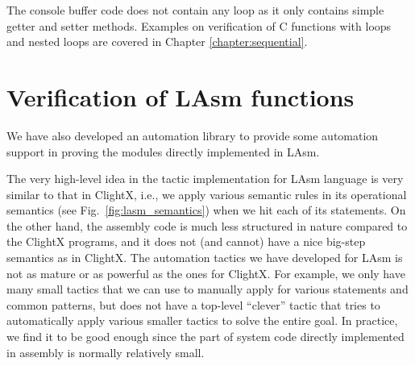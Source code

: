 The console buffer code does not contain any loop as it only contains simple
getter and setter methods. Examples on verification of C functions with loops and nested
loops are covered in Chapter \ref{chapter:sequential}.

\section{Verification of LAsm functions}
We have also developed an automation library to provide some
automation support in proving the modules directly implemented in LAsm.

The very high-level idea in the tactic implementation for LAsm language
is very similar to that in ClightX, i.e., we apply various semantic rules
in its operational semantics (see Fig.~\ref{fig:lasm_semantics}) when we
hit each of its statements.
On the other hand, the assembly code is much
less structured in nature compared to the ClightX programs, and it
does not (and cannot) have a nice big-step semantics as in ClightX.
The automation tactics we have developed for LAsm is not
as mature or as powerful as the ones for ClightX. For example, we only
have many small tactics that we can use to manually apply for various
statements and common patterns, but does not have a top-level ``clever''
tactic that tries to automatically apply various smaller tactics to
solve the entire goal. In practice, we find it to be good enough
since the part of system code directly implemented in assembly
is normally relatively small.